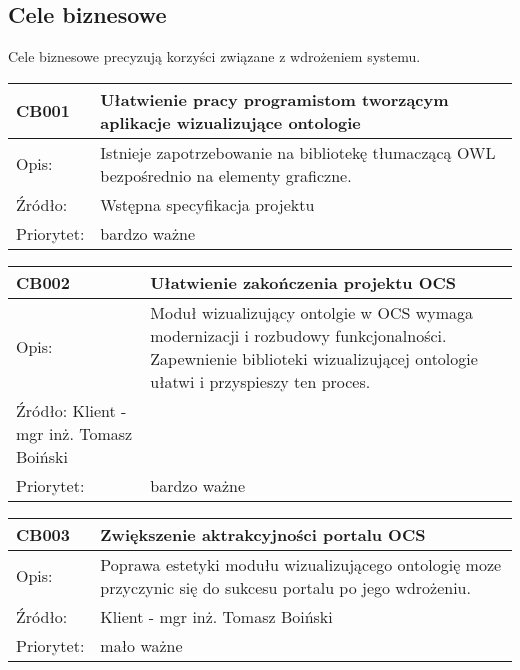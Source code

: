 \documentclass[a4paper,10pt]{article}
\begin{document}
\subsection{Cele biznesowe}

Cele biznesowe precyzują korzyści związane z wdrożeniem systemu.

\begin{center}
\begin{tabular}{|l|l|} \hline

CB001 & Ułatwienie pracy programistom tworzącym aplikacje wizualizujące ontologie  \\ \hline
Opis: & Istnieje zapotrzebowanie na bibliotekę tłumaczącą OWL bezpośrednio na elementy graficzne.  \\ \hline
Źródło: & Wstępna specyfikacja projektu \\ \hline
Priorytet: & bardzo ważne \\ \hline
\end{tabular}
\end{center}
\begin{center}
\begin{tabular}{|l|l|} \hline
CB002 & Ułatwienie zakończenia projektu OCS   \\ \hline
Opis: & Moduł wizualizujący ontolgie w OCS wymaga modernizacji i rozbudowy funkcjonalności. Zapewnienie biblioteki wizualizującej ontologie ułatwi i przyspieszy ten proces.  \\ \hline
Źródło: Klient - mgr inż. Tomasz Boiński &  \\ \hline
Priorytet: & bardzo ważne \\ \hline
\end{tabular}
\end{center}

\begin{center}
\begin{tabular}{|l|l|} \hline
CB003 & Zwiększenie aktrakcyjności portalu OCS   \\ \hline
Opis: & Poprawa estetyki modułu wizualizującego ontologię moze przyczynic się do sukcesu portalu po jego wdrożeniu.  \\ \hline
Źródło: & Klient - mgr inż. Tomasz Boiński \\ \hline
Priorytet: & mało ważne \\ \hline
\end{tabular}
\end{center}
\end{document}
